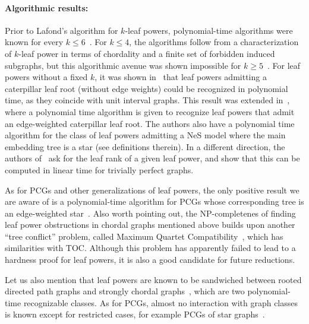\documentclass[11pt, letter]{article}
\theoremstyle{remark}
\begin{document}
\paragraph{Algorithmic results:}  Prior to Lafond's algorithm for $k$-leaf powers, polynomial-time algorithms were known for every $k \leq 6$~\cite{brandstadt2006structure,brandstadt2008structure,chang20073,ducoffe20194}.  
For $k \leq 4$, the algorithms follow from a characterization of $k$-leaf power in terms of chordality and a finite set of forbidden induced subgraphs, but this algorithmic avenue was shown impossible for $k \geq 5$~\cite{dupre2024k}.
For leaf powers without a fixed $k$, it was shown in~\cite{brandstadt2010rooted} that leaf powers admitting a caterpillar leaf root 
(without edge weights) could be recognized in polynomial time, as they coincide with unit interval graphs.  This result was extended in~\cite{benjamin2022recognition}, where  a polynomial time algorithm is given to recognize leaf powers that admit an edge-weighted caterpillar leaf root.  The authors also have a polynomial time algorithm for the class of leaf powers admitting a NeS
model where the main embedding tree is a star (see definitions therein).  
In a different direction, the authors of~\cite{le2023computing} ask for the leaf rank of a given leaf power, and show that this can be computed in linear time for trivially perfect graphs.  

As for PCGs and other generalizations of leaf powers, the only positive result we are aware of is a polynomial-time algorithm for PCGs whose corresponding tree is an edge-weighted star~\cite{xiao2020characterizing,kobayashi2022linear}.  Also worth pointing out, the NP-completenes of finding leaf power obstructions in chordal graphs mentioned above builds upon another ``tree conflict'' problem, called Maximum Quartet Compatibility~\cite{steel1992complexity}, which has similarities with TOC.  Although this problem has apparently failed to lead to a hardness proof for leaf powers, it is also a good candidate for future reductions.

Let us also mention that leaf powers are known to be sandwiched between rooted directed path graphs and strongly chordal graphs~\cite{brandstadt2010rooted}, which are two polynomial-time recognizable classes.  As for PCGs, almost no interaction with graph classes is known except for restricted cases, for example PCGs of star graphs~\cite{xiao2020characterizing}.
\end{document}
